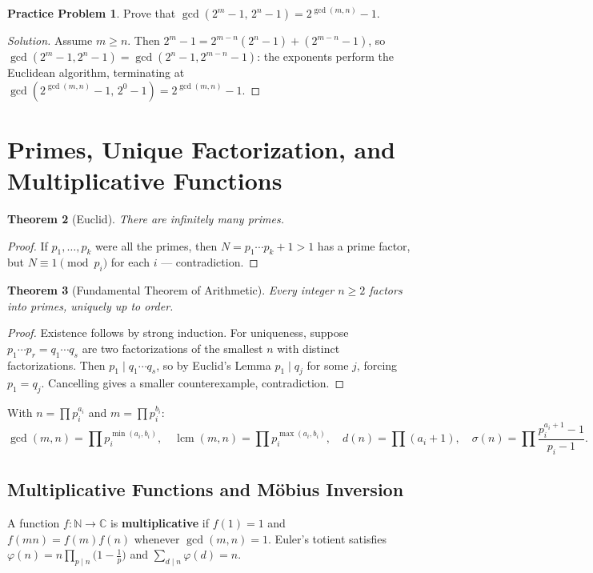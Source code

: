 \documentclass[11pt]{article}
\theoremstyle{plain}
\newtheorem{theorem}{Theorem}[section]
\theoremstyle{definition}
\newtheorem{problem}[theorem]{Practice Problem}
\newenvironment{solution}{\begin{proof}[Solution]}{\end{proof}}
\newcommand{\CC}{\mathbb{C}}
\newcommand{\NN}{\mathbb{N}}
\DeclareMathOperator{\lcm}{lcm}
\begin{document}
\begin{problem}
Prove that $\gcd(2^m - 1,\, 2^n - 1) = 2^{\gcd(m,n)} - 1$.
\end{problem}
\begin{solution}
Assume $m \ge n$. Then
$2^m - 1 = 2^{m-n}(2^n - 1) + (2^{m-n} - 1)$, so
$\gcd(2^m - 1, 2^n - 1) = \gcd(2^n - 1, 2^{m-n}-1)$: the exponents perform the
Euclidean algorithm, terminating at
$\gcd(2^{\gcd(m,n)}-1,\, 2^0 - 1) = 2^{\gcd(m,n)} - 1$.
\end{solution}

\section{Primes, Unique Factorization, and Multiplicative Functions}

\begin{theorem}[Euclid]
There are infinitely many primes.
\end{theorem}
\begin{proof}
If $p_1,\dots,p_k$ were all the primes, then $N = p_1\cdots p_k + 1 > 1$ has a
prime factor, but $N \equiv 1 \pmod{p_i}$ for each $i$ --- contradiction.
\end{proof}

\begin{theorem}[Fundamental Theorem of Arithmetic]
Every integer $n \ge 2$ factors into primes, uniquely up to order.
\end{theorem}
\begin{proof}
Existence follows by strong induction. For uniqueness,
suppose $p_1\cdots p_r = q_1 \cdots q_s$ are two factorizations of the
smallest $n$ with distinct factorizations. Then $p_1 \mid q_1\cdots q_s$, so
by Euclid's Lemma $p_1 \mid q_j$ for some $j$, forcing $p_1 = q_j$.
Cancelling gives a smaller counterexample, contradiction.
\end{proof}

With $n = \prod p_i^{a_i}$ and $m = \prod p_i^{b_i}$:
\[
\gcd(m,n) = \prod p_i^{\min(a_i,b_i)}, \quad
\lcm(m,n) = \prod p_i^{\max(a_i,b_i)}, \quad
d(n) = \prod (a_i + 1), \quad
\sigma(n) = \prod \frac{p_i^{a_i+1}-1}{p_i - 1}.
\]

\subsection{Multiplicative Functions and Möbius Inversion}
A function $f\colon\NN\to\CC$ is \textbf{multiplicative} if $f(1)=1$ and $f(mn)=f(m)f(n)$ whenever $\gcd(m,n)=1$. Euler's totient satisfies $\varphi(n) = n\prod_{p\mid n}\bigl(1 - \frac{1}{p}\bigr)$ and $\sum_{d\mid n}\varphi(d) = n$.
\end{document}
